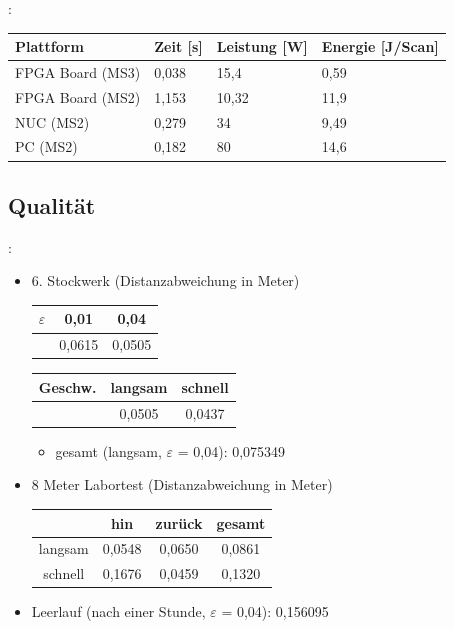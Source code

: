 \documentclass{beamer}
\begin{document}
\begin{frame}{\secname: \subsecname}
\centering
\begin{tabular}{llll}
\toprule
Plattform & Zeit [s] & Leistung [W] & Energie [J/Scan] \\
\midrule
FPGA Board (MS3) & 0,038 & 15,4 & 0,59 \\
FPGA Board (MS2) & 1,153 & 10,32 & 11,9 \\
NUC (MS2) & 0,279 & 34 & 9,49 \\
PC (MS2) & 0,182 & 80 & 14,6 \\
\bottomrule
\end{tabular}
\end{frame}

\subsection{Qualität}
\begin{frame}{\secname: \subsecname}
\begin{itemize}
\item{6. Stockwerk (Distanzabweichung in Meter)}
\begin{center}
\begin{tabular}{ccc}
    \toprule
    $\varepsilon$ & 0,01 & 0,04 \\ 
    \midrule
    & 0,0615 & 0,0505 \\  
    \bottomrule
\end{tabular}
\end{center}
\begin{center}
\begin{tabular}{ccc}
    \toprule
    Geschw. & langsam & schnell \\ 
    \midrule
    & 0,0505 & 0,0437 \\  
    \bottomrule
\end{tabular}
\end{center}
\begin{itemize}
    \item{gesamt (langsam, $\varepsilon$ = 0,04): 0,075349}
\end{itemize}
\item{8 Meter Labortest (Distanzabweichung in Meter)}
\begin{center}
\begin{tabular}{cccc}
    \toprule
    & hin & zurück & gesamt \\ 
    \midrule
    langsam & 0,0548 & 0,0650 & 0,0861 \\  
    schnell & 0,1676 & 0,0459 & 0,1320 \\
    \bottomrule
\end{tabular}
\end{center}
\item{Leerlauf (nach einer Stunde, $\varepsilon$ = 0,04): 0,156095}
\end{itemize}
\end{frame}
\end{document}
